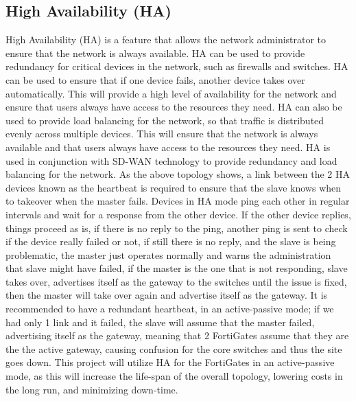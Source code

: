 \documentclass[12pt]{report}
\begin{document}
\subsection{High Availability (HA)}
High Availability (HA) is a feature that allows the network administrator to ensure that the network is always available. HA can be used to provide redundancy for critical devices in the network, such as firewalls and switches. HA can be used to ensure that if one device fails, another device takes over automatically. This will provide a high level of availability for the network and ensure that users always have access to the resources they need. HA can also be used to provide load balancing for the network, so that traffic is distributed evenly across multiple devices. This will ensure that the network is always available and that users always have access to the resources they need. HA is used in conjunction with SD-WAN technology to provide redundancy and load balancing for the network. %
As the above topology shows, a link between the 2 HA devices known as the heartbeat is required to ensure that the slave knows when to takeover when the master fails. Devices in HA mode ping each other in regular intervals and wait for a response from the other device. If the other device replies, things proceed as is, if there is no reply to the ping, another ping is sent to check if the device really failed or not, if still there is no reply, and the slave is being problematic, the master just operates normally and warns the administration that slave might have failed, if the master is the one that is not responding, slave takes over, advertises itself as the gateway to the switches until the issue is fixed, then the master will take over again and advertise itself as the gateway. It is recommended to have a redundant heartbeat, in an active-passive mode; if we had only 1 link and it failed, the slave will assume that the master failed, advertising itself as the gateway, meaning that 2 FortiGates assume that they are the the active gateway, causing confusion for the core switches and thus the site goes down. This project will utilize HA for the FortiGates in an active-passive mode, as this will increase the life-span of the overall topology, lowering costs in the long run, and minimizing down-time. %
\end{document}
